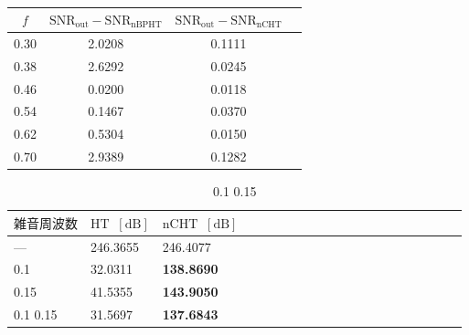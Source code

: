 \documentclass[technicalreport]{ieicej}
\begin{document}
\begin{table}[h]
  \caption{}
  \label{n_variable_nBPHTの評価値}
  \centering
  \begin{tabular}{cccc}
    \hline
    $f$ & $\mathrm{SNR}_{\mathrm{out}}-\mathrm{SNR}_{\mathrm{nBPHT}}$  & $\mathrm{SNR}_{\mathrm{out}}-\mathrm{SNR}_{\mathrm{nCHT}}$\\
    \hline \hline
    0.30  & 2.0208  & 0.1111\\
    0.38  & 2.6292  & 0.0245\\
    0.46  & 0.0200  & 0.0118\\
    0.54  & 0.1467  & 0.0370\\
    0.62  & 0.5304  & 0.0150\\
    0.70  & 2.9389  & 0.1282\\
    \hline
  \end{tabular}
\end{table}

\begin{table}[h]
  \caption{0.1 0.15}
  \label{n_variable_nBPHTの評価値}
  \centering
  \begin{tabular}{lllccccccccccccccccc}
    \hline
    $雑音周波数$ & $\mathrm{HT}\;\;[\mathrm{dB}]$  & $\mathrm{nCHT}\;\;[\mathrm{dB}]$\\
    \hline \hline
    ---  & 246.3655  & 246.4077\\
   0.1 & 32.0311  & \textbf{138.8690}\\
   0.15 & 41.5355  & \textbf{143.9050}\\
   0.1 0.15  & 31.5697  & \textbf{137.6843}\\
    \hline
  \end{tabular}
\end{table}
\end{document}
